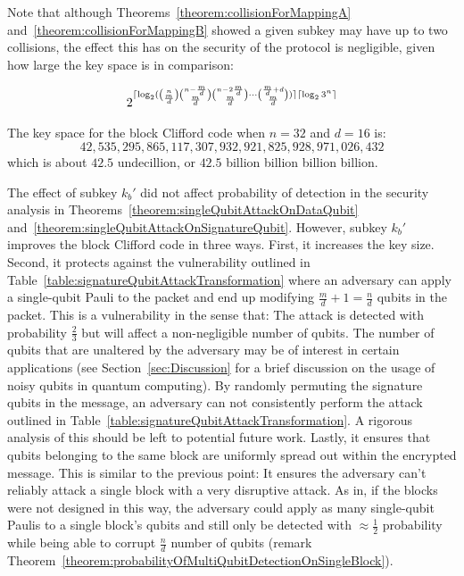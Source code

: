 Note that although Theorems~\ref{theorem:collisionForMappingA} and~\ref{theorem:collisionForMappingB} showed a given subkey may have up to two collisions, the effect this has on the security of the protocol is negligible, given how large the key space is in comparison:

\begin{align}
2^{\lceil\log_2 ({n \choose \frac{m}{d}}{n - \frac{m}{d} \choose \frac{m}{d}}{n - 2\frac{m}{d} \choose \frac{m}{d}}\cdots{\frac{m}{d} + d \choose \frac{m}{d}})\rceil\lceil\log_2 3^n\rceil}
\end{align}

\begin{example}
The key space for the block Clifford code when $n = 32$ and $d = 16$ is:
$$42,535,295,865,117,307,932,921,825,928,971,026,432$$
which is about $42.5$ undecillion, or $42.5$ billion billion billion billion.
\end{example}

The effect of subkey $k_b'$ did not affect probability of detection in the security analysis in Theorems~\ref{theorem:singleQubitAttackOnDataQubit} and~\ref{theorem:singleQubitAttackOnSignatureQubit}. However, subkey $k_b'$ improves the block Clifford code in three ways. First, it increases the key size. Second, it protects against the vulnerability outlined in Table~\ref{table:signatureQubitAttackTransformation} where an adversary can apply a single-qubit Pauli to the packet and end up modifying $\frac{m}{d} + 1 = \frac{n}{d}$ qubits in the packet. This is a vulnerability in the sense that: The attack is detected with probability $\frac{2}{3}$ but will affect a non-negligible number of qubits. The number of qubits that are unaltered by the adversary may be of interest in certain applications (see Section~\ref{sec:Discussion} for a brief discussion on the usage of noisy qubits in quantum computing). By randomly permuting the signature qubits in the message, an adversary can not consistently perform the attack outlined in Table~\ref{table:signatureQubitAttackTransformation}. A rigorous analysis of this should be left to potential future work. Lastly, it ensures that qubits belonging to the same block are uniformly spread out within the encrypted message. This is similar to the previous point: It ensures the adversary can't reliably attack a single block with a very disruptive attack. As in, if the blocks were not designed in this way, the adversary could apply as many single-qubit Paulis to a single block's qubits and still only be detected with $\approx \frac{1}{2}$ probability while being able to corrupt $\frac{n}{d}$ number of qubits (remark Theorem~\ref{theorem:probabilityOfMultiQubitDetectionOnSingleBlock}).

